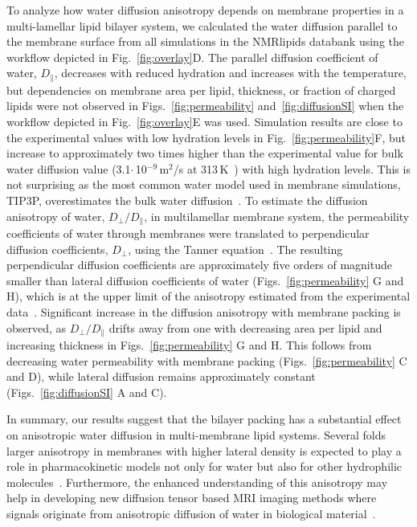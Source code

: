 \documentclass[fleqn,10pt]{wlscirep}
\begin{document}
To analyze how water diffusion anisotropy depends on membrane properties in a multi-lamellar lipid bilayer system, we calculated the water diffusion parallel to the membrane surface from all simulations in the NMRlipids databank using the workflow depicted in Fig.~\ref{fig:overlay}D. The parallel diffusion coefficient of water, $D_\parallel$, decreases with reduced hydration and increases with the temperature, but dependencies on membrane area per lipid, thickness, or fraction of charged lipids were not observed in Figs.~\ref{fig:permeability} and~\ref{fig:diffusionSI} when the workflow depicted in Fig.~\ref{fig:overlay}E was used. Simulation results are close to the experimental values with low hydration levels in Fig.~\ref{fig:permeability}F, but increase to approximately two times higher than the experimental value for bulk water diffusion value (3.1$\cdot$\,10$^{-9}$\,m$^2$/s at 313\,K~\cite{khakimov08}) with high hydration levels. This is not surprising as the most common water model used in membrane simulations, TIP3P, overestimates the bulk water diffusion~\cite{pathirannahalage21}. To estimate the diffusion anisotropy of water, $D_\perp/D_\parallel$, in multilamellar membrane system, the permeability coefficients of water through membranes were translated to perpendicular diffusion coefficients, $D_\perp$, using the Tanner equation~\cite{tanner78,wasterby02}. The resulting perpendicular diffusion coefficients are approximately five orders of magnitude smaller than lateral diffusion coefficients of water (Figs.~\ref{fig:permeability} G and H), which is at the upper limit of the anisotropy estimated from the experimental data~\cite{nitsche19}. Significant increase in the diffusion anisotropy with membrane packing is observed, as $D_\perp/D_\parallel$ drifts away from one with decreasing area per lipid and increasing thickness in Figs.~\ref{fig:permeability} G and H. This follows from decreasing water permeability with membrane packing (Figs.~\ref{fig:permeability} C and D), while lateral diffusion remains approximately constant (Figs.~\ref{fig:diffusionSI} A and C). 

In summary, our results suggest that the bilayer packing has a substantial effect on anisotropic water diffusion in multi-membrane lipid systems. Several folds larger anisotropy in membranes with higher lateral density is expected to play a role in pharmacokinetic models not only for water but also for other hydrophilic molecules~\cite{nitsche19}. Furthermore, the enhanced understanding of this anisotropy may help in developing new diffusion tensor based MRI imaging methods where signals originate from anisotropic diffusion of water in biological material~\cite{topgaard20}.
\end{document}
